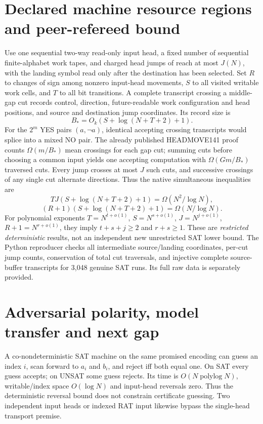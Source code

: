 \documentclass[11pt]{article}
\begin{document}
\section{Declared machine resource regions and peer-refereed bound}
Use one sequential two-way read-only input head, a fixed number of sequential finite-alphabet work tapes, and charged head jumps of reach at most $J(N)$, with the landing symbol read only after the destination has been selected. Set $R$ to changes of sign among nonzero input-head movements, $S$ to all visited writable work cells, and $T$ to all bit transitions. A complete transcript crossing a middle-gap cut records control, direction, future-readable work configuration and head positions, and source and destination jump coordinates. Its record size is
\[
B_*=O_k(S+\log(N+T+2)+1).
\]
For the $2^m$ YES pairs $(a,\neg a)$, identical accepting crossing transcripts would splice into a mixed NO pair. The already published HEADMOVE141 proof counts $\Omega(m/B_*)$ mean crossings for each gap cut; summing cuts before choosing a common input yields one accepting computation with $\Omega(Gm/B_*)$ traversed cuts. Every jump crosses at most $J$ such cuts, and successive crossings of any single cut alternate directions. Thus the native simultaneous inequalities are
\[
TJ(S+\log(N+T+2)+1)=\Omega(N^2/\log N),
\]
\[
(R+1)(S+\log(N+T+2)+1)=\Omega(N/\log N).
\]
For polynomial exponents $T=N^{t+o(1)}$, $S=N^{s+o(1)}$, $J=N^{j+o(1)}$, $R+1=N^{r+o(1)}$, they imply $t+s+j\ge2$ and $r+s\ge1$. These are \emph{restricted deterministic} results, not an independent new unrestricted SAT lower bound. The Python reproducer checks all intermediate source/landing coordinates, per-cut jump counts, conservation of total cut traversals, and injective complete source-buffer transcripts for 3,048 genuine SAT runs. Its full raw data is separately provided.

\section{Adversarial polarity, model transfer and next gap}
A co-nondeterministic SAT machine on the same promised encoding can guess an index $i$, scan forward to $a_i$ and $b_i$, and reject iff both equal one. On SAT every guess accepts; on UNSAT some guess rejects. Its time is $O(N\operatorname{polylog}N)$, writable/index space $O(\log N)$ and input-head reversals zero. Thus the deterministic reversal bound does not constrain certificate guessing. Two independent input heads or indexed RAT input likewise bypass the single-head transport premise.
\end{document}
